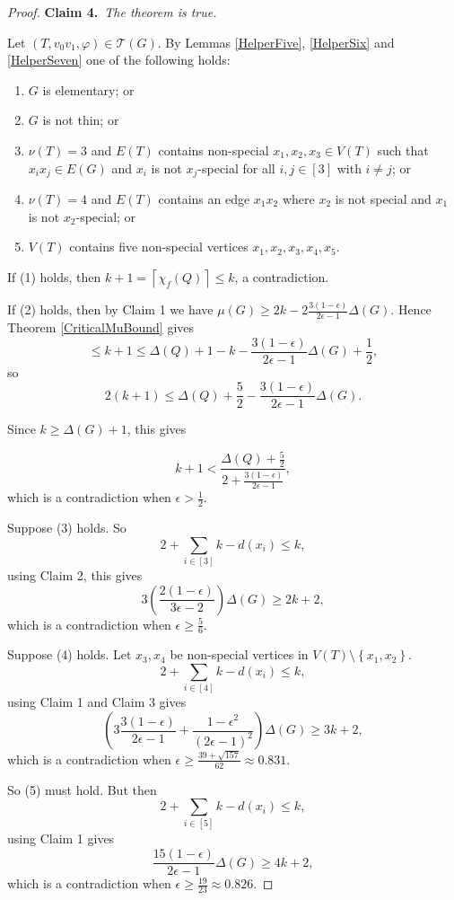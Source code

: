 \documentclass[12pt]{amsart}
\theoremstyle{plain}
\theoremstyle{definition}
\theoremstyle{remark}
\newcommand{\fancy}[1]{\mathcal{#1}}
\newcommand{\T}{\fancy{T}}
\newcommand{\set}[1]{\left\{ #1 \right\}}
\newcommand{\ceil}[1]{\left\lceil#1\right\rceil}
\newcommand{\irange}[1]{\left[#1\right]}
\newcommand{\parens}[1]{\left( #1 \right)}
\newcommand{\vph}{\varphi}
\newcommand{\claim}[2]{{\noindent\bf Claim #1.}~{\it #2}~~}
\begin{document}
\begin{proof}
\claim{4}{The theorem is true.}

Let $(T, v_0v_1, \vph) \in \T(G)$. By Lemmas \ref{HelperFive}, \ref{HelperSix} and \ref{HelperSeven} one of the following holds:
\begin{enumerate}
\item $G$ is elementary; or
\item $G$ is not thin; or
\item $\nu(T) = 3$ and $E(T)$ contains non-special $x_1,x_2,x_3 \in V(T)$ such that $x_ix_j \in E(G)$ and $x_i$ is not $x_j$-special for all $i,j \in \irange{3}$ with $i \ne j$; or
\item $\nu(T) = 4$ and $E(T)$ contains an edge $x_1x_2$ where $x_2$ is not special and $x_1$ is not $x_2$-special; or
\item $V(T)$ contains five non-special vertices $x_1, x_2, x_3, x_4, x_5$.
\end{enumerate}

If (1) holds, then $k + 1 = \ceil{\chi_f(Q)} \le k$, a contradiction.

If (2) holds, then by Claim 1 we have $\mu(G) \ge 2k - 2\frac{3(1-\epsilon)}{2\epsilon -1}\Delta(G)$.  Hence Theorem \ref{CriticalMuBound} gives
\[\le k + 1 \le \Delta(Q) + 1 - k - \frac{3(1-\epsilon)}{2\epsilon -1}\Delta(G) + \frac12,\]
so
\[2(k + 1) \le \Delta(Q) + \frac52 - \frac{3(1-\epsilon)}{2\epsilon -1}\Delta(G).\]

Since $k \ge \Delta(G) + 1$, this gives

\[k + 1 < \frac{\Delta(Q) + \frac52}{2 + \frac{3(1-\epsilon)}{2\epsilon -1}},\]
which is a contradiction when $\epsilon > \frac12$.

Suppose (3) holds.  So
\[2 + \sum_{i \in \irange{3}} k - d(x_i) \le k,\]
using Claim 2, this gives
\[3\parens{\frac{2(1-\epsilon)}{3\epsilon - 2}}\Delta(G) \ge 2k+2,\]
which is a contradiction when $\epsilon \ge \frac56$.

Suppose (4) holds.  Let $x_3,x_4$ be non-special vertices in $V(T) \setminus \set{x_1,x_2}$.
\[2 + \sum_{i \in \irange{4}} k - d(x_i) \le k,\]
using Claim 1 and Claim 3 gives
\[\parens{3\frac{3(1-\epsilon)}{2\epsilon -1} + \frac{1 - \epsilon^2}{\parens{2\epsilon - 1}^2}}\Delta(G) \ge 3k+2,\]
which is a contradiction when $\epsilon \ge \frac{39 + \sqrt{157}}{62} \approx 0.831$.

So (5) must hold.  But then
\[2 + \sum_{i \in \irange{5}} k - d(x_i) \le k,\]
using Claim 1 gives
\[\frac{15(1-\epsilon)}{2\epsilon -1}\Delta(G) \ge 4k+2,\]
which is a contradiction when $\epsilon \ge \frac{19}{23} \approx 0.826$.

\end{proof}
\end{document}

